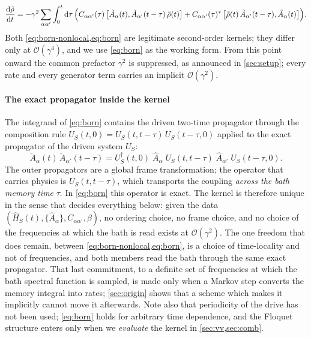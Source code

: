 \documentclass[a4paper,11pt]{article}
\begin{document}
\begin{equation}\label{eq:born}
  \dv{\tilde\rho}{t}
  = -\gamma^2\sum_{\alpha\alpha'}\int_0^t \dd\tau\,\Big(
    C_{\alpha\alpha'}(\tau)\,\comm{\tilde A_\alpha(t)}{\tilde A_{\alpha'}(t-\tau)\,\tilde\rho(t)}
    + C_{\alpha\alpha'}(\tau)^*\,\comm{\tilde\rho(t)\,\tilde A_{\alpha'}(t-\tau)}{\tilde A_\alpha(t)}
  \Big).
\end{equation}
Both \cref{eq:born-nonlocal,eq:born} are legitimate second-order kernels; they differ only at $\mathcal O(\gamma^4)$, and we use \cref{eq:born} as the working form. From this point onward the common prefactor $\gamma^2$ is suppressed, as announced in \cref{sec:setup}; every rate and every generator term carries an implicit $\mathcal O(\gamma^2)$.

\paragraph{The exact propagator inside the kernel}
The integrand of \cref{eq:born} contains the driven two-time propagator through the composition rule $U_S(t,0) = U_S(t,t-\tau)\,U_S(t-\tau,0)$ applied to the exact propagator of the driven system $U_S$:
\begin{equation}\label{eq:twotime}
  \tilde A_\alpha(t)\,\tilde A_{\alpha'}(t-\tau)
  = U_S^\dagger(t,0)\;\hat A_\alpha\;U_S(t,t-\tau)\;\hat A_{\alpha'}\;U_S(t-\tau,0).
\end{equation}
The outer propagators are a global frame transformation; the operator that carries physics is $U_S(t,t-\tau)$, which transports the coupling \emph{across the bath memory time} $\tau$. In \cref{eq:born} this operator is exact. The kernel is therefore unique in the sense that decides everything below: given the data $(\hat H_S(t), \{\hat A_\alpha\}, C_{\alpha\alpha'}, \beta)$, no ordering choice, no frame choice, and no choice of the frequencies at which the bath is read exists at $\mathcal O(\gamma^2)$. The one freedom that does remain, between \cref{eq:born-nonlocal,eq:born}, is a choice of time-locality and not of frequencies, and both members read the bath through the same exact propagator. That last commitment, to a definite set of frequencies at which the bath spectral function is sampled, is made only when a Markov step converts the memory integral into rates; \cref{sec:origin} shows that a scheme which makes it implicitly cannot move it afterwards. Note also that periodicity of the drive has not been used; \cref{eq:born} holds for arbitrary time dependence, and the Floquet structure enters only when we \emph{evaluate} the kernel in \cref{sec:vv,sec:comb}.
\end{document}
